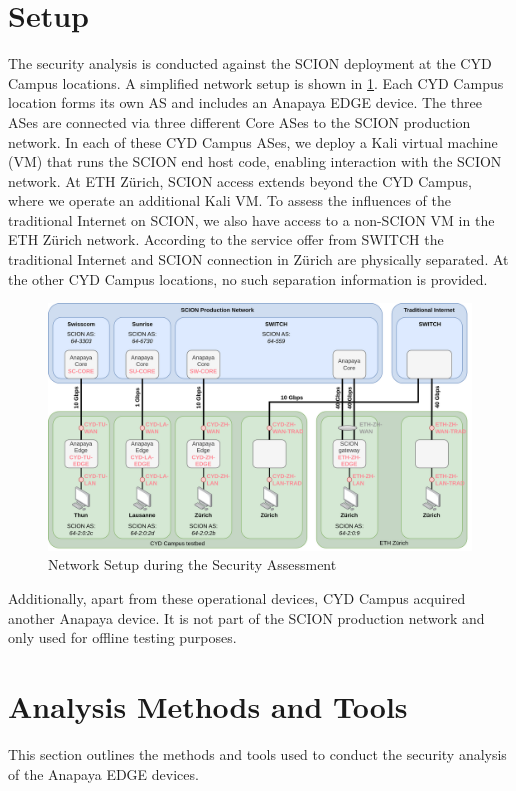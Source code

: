 \section{Setup}
\label{sec:setup}
The security analysis is conducted against the SCION deployment at the CYD Campus locations.
A simplified network setup is shown in \cref{fig:network-setup}.
Each CYD Campus location forms its own AS and includes an Anapaya EDGE device.
The three ASes are connected via three different Core ASes to the SCION production network.
In each of these CYD Campus ASes, we deploy a Kali virtual machine (VM) that runs the SCION end host code, enabling interaction with the SCION network.
At ETH Zürich, SCION access extends beyond the CYD Campus, where we operate an additional Kali VM.
To assess the influences of the traditional Internet on SCION, we also have access to a non-SCION VM in the ETH Zürich network.
According to the service offer from SWITCH the traditional Internet and SCION connection in Zürich are physically separated.
At the other CYD Campus locations, no such separation information is provided.

\begin{figure}[h]
    \centering
    \includegraphics[width=\textwidth]{figures/scion_setup2.drawio.png}
    \caption{Network Setup during the Security Assessment}
    \label{fig:network-setup}
\end{figure}

Additionally, apart from these operational devices, CYD Campus acquired another Anapaya device.
It is not part of the SCION production network and only used for offline testing purposes.

\newpage
\section{Analysis Methods and Tools}
\label{sec:analysis-methods-tools}
This section outlines the methods and tools used to conduct the security analysis of the Anapaya EDGE devices.

